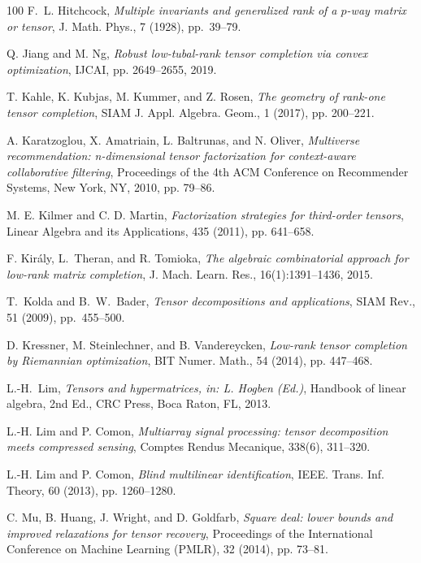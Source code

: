 \documentclass{amsart}
\theoremstyle{definition}
\numberwithin{equation}{section}
\begin{document}
\begin{thebibliography}{100}
{\sc F.~L. Hitchcock},  
{\em Multiple invariants and generalized rank of a $p$-way matrix or tensor}, 
J. Math. Phys., 
7 (1928), pp.~39--79.

{\sc Q. Jiang and M. Ng}, 
{\em Robust low-tubal-rank tensor completion via convex optimization},
IJCAI, pp. 2649--2655, 2019.

{\sc T. Kahle, K. Kubjas, M. Kummer, and Z. Rosen}, 
{\em The geometry of rank-one tensor completion}, 
SIAM J. Appl. Algebra. Geom., 
1 (2017), pp. 200--221.

{\sc A. Karatzoglou, X. Amatriain, L. Baltrunas, and N. Oliver}, 
{\em Multiverse recommendation: n-dimensional tensor factorization for context-aware collaborative filtering}, 
Proceedings of the 4th ACM Conference on Recommender Systems, 
New York, NY, 2010, pp. 79--86.

{\sc M. E. Kilmer and C. D. Martin}, 
{\em Factorization strategies for third-order tensors}, 
Linear Algebra and its Applications, 
435 (2011), pp. 641--658.

{\sc F. Kir\'{a}ly, L.~Theran, and R. Tomioka},
{\em The algebraic combinatorial approach for low-rank matrix completion},
J. Mach. Learn. Res., 
16(1):1391--1436, 2015.

{\sc T.~Kolda and B.~W.~Bader},
{\em Tensor decompositions and applications},
SIAM Rev., 
51 (2009), pp.~455--500.

{\sc D. Kressner, M. Steinlechner, and B. Vandereycken}, 
{\em Low-rank tensor completion by Riemannian optimization}, 
BIT Numer. Math., 
54 (2014), pp. 447--468.

{\sc L.-H.~Lim},
{\em Tensors and hypermatrices, in: L. Hogben (Ed.)},
Handbook of linear algebra, 2nd Ed.,
CRC Press, Boca Raton, FL, 2013.

{\sc L.-H. Lim and P. Comon}, 
{\em Multiarray signal processing: tensor decomposition meets compressed sensing}, 
Comptes Rendus Mecanique, 338(6), 311--320.

{\sc L.-H. Lim and P. Comon}, 
{\em Blind multilinear identification}, 
IEEE. Trans. Inf. Theory, 60
(2013), pp. 1260--1280.

{\sc C. Mu, B. Huang, J. Wright, and D. Goldfarb}, 
{\em Square deal: lower bounds and improved relaxations for tensor recovery}, 
Proceedings of the International Conference on Machine Learning (PMLR), 
32 (2014), pp. 73--81.


\end{thebibliography}
\end{document}
